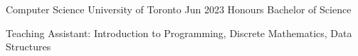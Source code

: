 
\begin{cventries}
  \cventry
    {Computer Science}
    {University of Toronto}
    {}
    {Jun 2023}
    {Honours Bachelor of Science}
    {
      \begin{cvitems}
        \item {Teaching Assistant: Introduction to Programming, Discrete Mathematics, Data Structures}
      \end{cvitems}
    }
\end{cventries}
